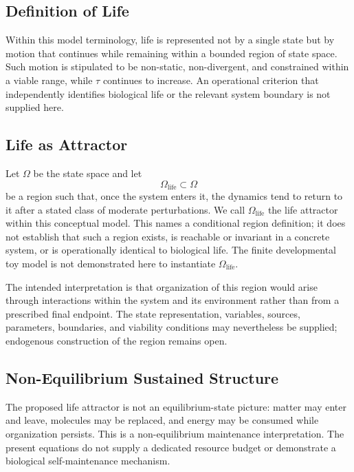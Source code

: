 \subsection{Definition of Life}

Within this model terminology, life is represented not by a single state but by motion that continues while remaining within a bounded region of state space. Such motion is stipulated to be non-static, non-divergent, and constrained within a viable range, while \(\tau\) continues to increase. An operational criterion that independently identifies biological life or the relevant system boundary is not supplied here.

\subsection{Life as Attractor}

Let \(\Omega\) be the state space and let
\begin{equation}
  \Omega_{\mathrm{life}} \subset \Omega
\end{equation}
be a region such that, once the system enters it, the dynamics tend to return to it after a stated class of moderate perturbations. We call \(\Omega_{\mathrm{life}}\) the life attractor within this conceptual model. This names a conditional region definition; it does not establish that such a region exists, is reachable or invariant in a concrete system, or is operationally identical to biological life. The finite developmental toy model is not demonstrated here to instantiate \(\Omega_{\mathrm{life}}\).

The intended interpretation is that organization of this region would arise through interactions within the system and its environment rather than from a prescribed final endpoint. The state representation, variables, sources, parameters, boundaries, and viability conditions may nevertheless be supplied; endogenous construction of the region remains open.

\subsection{Non-Equilibrium Sustained Structure}

The proposed life attractor is not an equilibrium-state picture: matter may enter and leave, molecules may be replaced, and energy may be consumed while organization persists. This is a non-equilibrium maintenance interpretation. The present equations do not supply a dedicated resource budget or demonstrate a biological self-maintenance mechanism.

